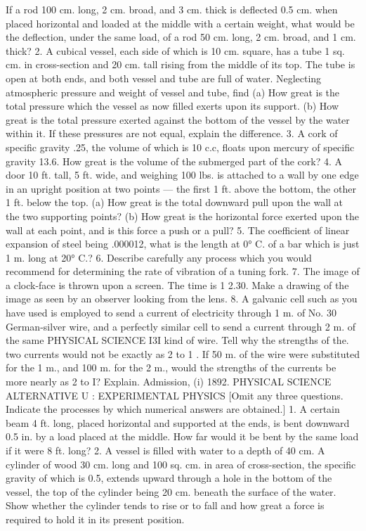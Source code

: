 If a rod 100 cm. long, 2 cm. broad, and 3 cm. thick is deflected 0.5 cm. when placed horizontal and loaded at the middle with a certain weight, what would be the deflection, under the same load, of a rod 50 cm. long, 2 cm. broad, and 1 cm. thick?
2. A cubical vessel, each side of which is 10 cm. square, has a tube 1 sq. cm. in cross-section and 20 cm. tall rising from the middle of its top. The tube is open at both ends, and both vessel and tube are full of water. Neglecting atmospheric pressure and weight of vessel and tube, find
(a) How great is the total pressure which the vessel as now filled exerts upon its support.
(b) How great is the total pressure exerted against the bottom of the vessel by the water within it.
If these pressures are not equal, explain the difference.
3. A cork of specific gravity .25, the volume of which is 10 c.c, floats upon mercury of specific gravity 13.6. How great is the volume of the submerged part of the cork?
4. A door 10 ft. tall, 5 ft. wide, and weighing 100 lbs. is attached to a wall by one edge in an upright position at two points — the first 1 ft. above the bottom, the other 1 ft. below the top.
(a) How great is the total downward pull upon the wall at the two supporting points?
(b) How great is the horizontal force exerted upon the wall at each point, and is this force a push or a pull?
5. The coefficient of linear expansion of steel being .000012, what is the length at 0° C. of a bar which is just 1 m. long at 20° C.?
6. Describe carefully any process which you would recommend for determining the rate of vibration of a tuning fork.
7. The image of a clock-face is thrown upon a screen. The time is 1 2.30. Make a drawing of the image as seen by an observer looking from the lens.
8. A galvanic cell such as you have used is employed to send a current of electricity through 1 m. of No. 30 German-silver wire, and a perfectly similar cell to send a current through 2 m. of the same
PHYSICAL SCIENCE I3I
kind of wire. Tell why the strengths of the. two currents would not be exactly as 2 to 1 .
If 50 m. of the wire were substituted for the 1 m., and 100 m. for the 2 m., would the strengths of the currents be more nearly as 2 to I? Explain.
Admission, (i) 1892.
PHYSICAL SCIENCE ALTERNATIVE U : EXPERIMENTAL PHYSICS
[Omit any three questions. Indicate the processes by which numerical answers are obtained.]
1. A certain beam 4 ft. long, placed horizontal and supported at the ends, is bent downward 0.5 in. by a load placed at the middle. How far would it be bent by the same load if it were 8 ft. long?
2. A vessel is filled with water to a depth of 40 cm. A cylinder of wood 30 cm. long and 100 sq. cm. in area of cross-section, the specific gravity of which is 0.5, extends upward through a hole in the bottom of the vessel, the top of the cylinder being 20 cm. beneath the surface of the water. Show whether the cylinder tends to rise or to fall and how great a force is required to hold it in its present position.
